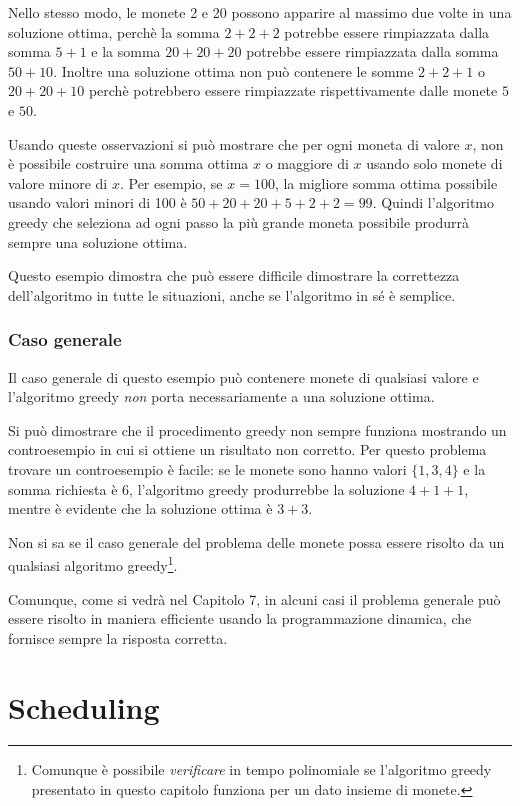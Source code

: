 Nello stesso modo, le monete 2 e 20 possono apparire al massimo due 
volte in una soluzione ottima, perchè la somma $2+2+2$ potrebbe essere
rimpiazzata dalla somma $5+1$ e la somma $20+20+20$ potrebbe essere rimpiazzata
dalla somma $50+10$.
Inoltre una soluzione ottima non può contenere le somme
$2+2+1$ o $20+20+10$ perchè potrebbero essere 
rimpiazzate rispettivamente dalle
monete $5$ e $50$.

Usando queste osservazioni 
si può mostrare che per ogni moneta di valore $x$,
non è possibile costruire una somma ottima $x$ o maggiore di $x$
usando solo monete di valore minore di $x$.
Per esempio, se $x=100$, la migliore somma ottima possibile
usando valori minori di 100 è $50+20+20+5+2+2=99$.
Quindi l'algoritmo greedy che seleziona ad ogni passo la più
grande moneta possibile produrrà sempre una soluzione ottima.

Questo esempio dimostra che può essere difficile
dimostrare la correttezza dell'algoritmo in tutte le situazioni,
anche se l'algoritmo in sé è semplice. 

\subsubsection{Caso generale}
Il caso generale di questo esempio può contenere monete
di qualsiasi valore e l'algoritmo greedy \emph{non} porta necessariamente
a una soluzione ottima.

Si può dimostrare che il procedimento greedy non sempre
funziona mostrando un controesempio in cui si ottiene un risultato non corretto.
Per questo problema trovare un controesempio è facile:
se le monete sono hanno valori $\{1,3,4\}$ e la somma richiesta è 6,
l'algoritmo greedy produrrebbe la soluzione 
$4+1+1$, mentre è evidente che la soluzione ottima è $3+3$.

Non si sa se il caso generale del problema delle monete
possa essere risolto da un qualsiasi algoritmo greedy\footnote{Comunque è possibile
\emph{verificare} in tempo polinomiale
se l'algoritmo greedy presentato in questo capitolo
funziona per un dato insieme di monete\cite{pea05}.}.

Comunque, come si vedrà nel Capitolo 7,
in alcuni casi il problema generale può essere risolto
in maniera efficiente usando la programmazione dinamica,
che fornisce sempre la risposta corretta.

\section{Scheduling}

